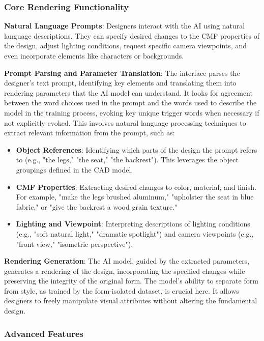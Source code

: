 \documentclass{article}
\begin{document}
\subsubsection{Core Rendering Functionality}

\textbf{Natural Language Prompts}: Designers interact with the AI using natural language descriptions. They can specify desired changes to the CMF properties of the design, adjust lighting conditions, request specific camera viewpoints, and even incorporate elements like characters or backgrounds. 

\textbf{Prompt Parsing and Parameter Translation}: The interface parses the designer's text prompt, identifying key elements and translating them into rendering parameters that the AI model can understand. It looks for agreement between the word choices used in the prompt and the words used to describe the model in the training process, evoking key unique trigger words when necessary if not explicitly evoked. This involves natural language processing techniques to extract relevant information from the prompt, such as:

\begin{itemize}
\item \textbf{Object References}: Identifying which parts of the design the prompt refers to (e.g., "the legs," "the seat," "the backrest"). This leverages the object groupings defined in the CAD model.
\item \textbf{CMF Properties}: Extracting desired changes to color, material, and finish. For example, "make the legs brushed aluminum," "upholster the seat in blue fabric," or "give the backrest a wood grain texture."
\item \textbf{Lighting and Viewpoint}: Interpreting descriptions of lighting conditions (e.g., "soft natural light," "dramatic spotlight") and camera viewpoints (e.g., "front view," "isometric perspective").
\end{itemize}

\textbf{Rendering Generation}: The AI model, guided by the extracted parameters, generates a rendering of the design, incorporating the specified changes while preserving the integrity of the original form. The model's ability to separate form from style, as trained by the form-isolated dataset, is crucial here. It allows designers to freely manipulate visual attributes without altering the fundamental design.

\subsubsection{Advanced Features}
\end{document}
